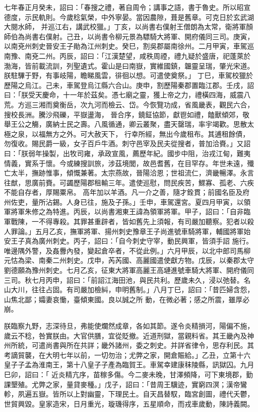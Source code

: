 \begin{pinyinscope}
七年春正月癸未，詔曰：「春搜之禮，著自周令；講事之語，書于魯史。所以昭宣德度，示民軌則。今歲稔氣榮，中外寧晏。當因農隙，葺是舊章。可克日於玄武湖大閱水師，
 并巡江右，講武校獵。」丁亥，以尚書右僕射王僧朗為太常，衛將軍顏師伯為尚書右僕射。己丑，以尚書令柳元景為驃騎大將軍、開府儀同三司。庚寅，以南兗州刺史晉安王子勛為江州刺史。癸巳，割吳郡屬南徐州。二月甲寅，車駕巡南豫、南兗二州。丙辰，詔曰：「江漢楚望，咸秩周禋，禮九疑於盛唐，祀蓬萊於渤海，皆前載流訓，列聖遺式。霍山是曰南嶽，實維國鎮，韞靈呈瑞，肇光宋道。朕駐驆于野，有事岐陽，瞻睇風雲，徘徊以想。可遣使奠祭。」
 丁巳，車駕校獵於歷陽之烏江。己未，車駕登烏江縣六合山。庚申，割歷陽秦郡置臨江郡。壬戌，詔曰：「朕受天慶命，十一年於茲矣。憑七廟之靈，獲上帝之力，禮橫四海，威震八荒。方巡三湘而奠衡岳，次九河而檢云、岱。今恢覽功成，省風畿表，觀民六合，搜校長洲。騰沙飛礫，平嶽盪海，
 晉合序，鐃鉦協節，獻鬯如禮，饁獸傾郊，敬舉王公之觴，廣納士民之壽。八風循通，卿云叢聚，盡天罄瑞，率宇竭歡。思散太極之泉，以福無方之外。可大赦天下，
 行幸所經，無出今歲租布。其逋租餘債，勿復收。賜民爵一級，女子百戶牛酒。刺守邑宰及民夫從搜者，普加洽賚。」又詔曰：「朕弱年操製，出牧司雍，承政宣風，薦歷年紀。國步中阻，治戎江甸，難夷情義，實系于懷。今或練搜訓旅，涉茲境閭，故邑耆舊，在目罕存。年世未遠，殲亡太半，撫跡惟事，傾慨兼著。太宗燕故，晉陽洽恩；世祖流仁，濟畿暢澤。永言往猷，思廣前賚。可蠲歷陽郡租輸三年。遣使巡慰，問民疾苦，鰥寡、孤老、六疾不能自存者，厚賜粟帛。
 高年加以羊酒。凡一介之善，隨才銓貫；前國名臣及府州佐吏，量所沾錫。人身已往，施及子孫。」壬申，車駕還宮。夏四月甲寅，以領軍將軍朱修之為特進。丙辰，以尚書湘東王諱為領軍將軍。甲子，詔曰：「自非臨軍戰陳，一不得專殺。其罪甚重辟者，皆如舊先上須報，有司嚴加聽察。犯者以殺人罪論。」五月乙亥，撫軍將軍、揚州刺史豫章王子尚進號車騎將軍，輔國將軍始安王子真為廣州刺史。丙子，詔曰：「自今刺史守宰，動民興軍，皆須手詔
 施行。唯邊隅外警，及姦釁內發，變起倉卒者，不從此例。」六月甲辰，以北中郎司馬柳元怙為梁、南秦二州刺史。戊申，芮芮國、高麗國遣使獻方物。戊辰，以秦郡太守劉德願為豫州刺史。七月乙亥，征東大將軍高麗王高璉進號車騎大將軍、開府儀同三司。秋七月丙申，詔曰：「前詔江海田池，與民共利。歷歲未久，浸以弛替。名山大川，往往占固。有司嚴加檢糾，申明舊制。」八月丁巳，詔曰：「昔匹婦含怨，山焦北鄙；孀妻哀慟，臺傾東國。良以誠之所
 動，在微必著；感之所震，雖厚必崩。



 朕臨察九野，志深待旦，弗能使爛然成章，各如其節。遂令炎精損河，陽偏不施，歲云不稔，咎實朕由。大官供膳，宜從貶撤。近道刑獄，當親料省。其王畿內及神州所統，可遣尚書與所在共詳；畿外諸州，委之刺史。并詳省律令，思存利民。其考謫貿襲，在大明七年以前，一切勿治；尤弊之家，開倉賑給。」乙丑，立第十六皇子子孟為淮南王，第十八皇子子產為臨賀王。車駕幸建康秣陵縣，訊獄囚。九月巳卯，詔曰：「
 近炎精亢序，苗稼多傷。今二麥未晚，甘澤頻降，可下東境郡，勤課墾殖。尤弊之家，量貸麥種。」戊子，詔曰：「昔周王驥迹，實窮四溟；漢帝鸞軫，夙遍五嶽。皆所以上對幽靈，下理民土。自天昌替馭，臨宮創圖，禮代夭鬱，世貿興毀。皇家造宋，日月重光，璇璣得序，五星順命，而戎車歲動，陳詩義闕。




\end{pinyinscope}
